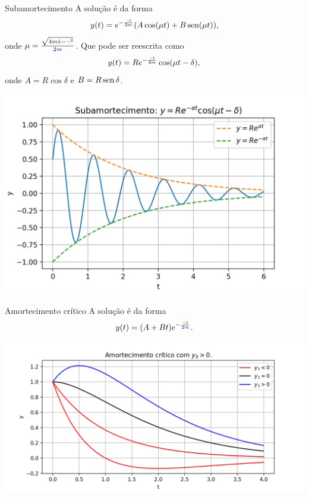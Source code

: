 \begin{frame}{Subamortecimento}
A solução é da forma
 \[y(t)=e^{-\frac{{\color{orange}\gamma}t}{2{\color{blue}m}}}(A\cos(\mu t)+B\operatorname{sen}(\mu t)),\]
onde $\mu=\frac{\sqrt{4{\color{blue}m {\color{red}k}}-{\color{orange}\gamma}^2}}{2{\color{blue}m}}$.
Que pode ser reescrita como
 \[y(t)=Re^{-\frac{{\color{orange}\gamma}t}{2{\color{blue}m}}}\cos(\mu t-\delta),\]
onde $A=R\cos\delta$ e $B=R\operatorname{sen}\delta$.

\begin{center}
\includegraphics[scale=0.45]{osc-subarm.png}
\end{center}
\end{frame}




\begin{frame}{Amortecimento crítico}
A solução é da forma
 \[y(t)=(A+Bt)e^{-\frac{{\color{orange}\gamma}t}{2{\color{blue}m}}}.\]


\begin{center}
\includegraphics[scale=0.5]{osc-critico.png}
\end{center}
\end{frame}

